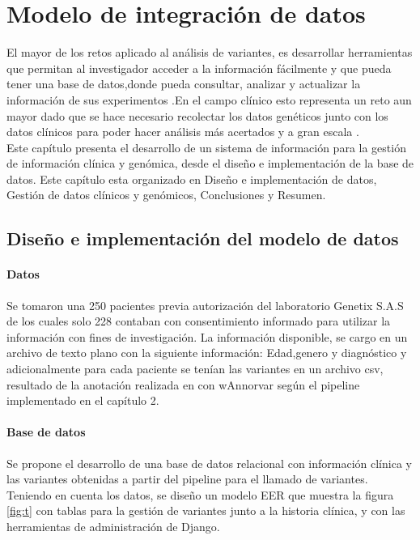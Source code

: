 \chapter{Modelo de integración de datos}

El mayor de los retos aplicado al análisis de variantes, es desarrollar herramientas que permitan al investigador acceder a la información fácilmente y que pueda tener una base de datos,donde pueda consultar, analizar y actualizar la información de sus experimentos \cite{Li2014}.En el campo clínico esto representa un reto aun mayor dado que se hace necesario recolectar los datos genéticos junto con los datos clínicos para poder hacer análisis más acertados y a gran escala \cite{Paila2013}.\\


Este capítulo presenta el desarrollo de un sistema de información para la gestión de información clínica y genómica, desde el diseño e implementación de la base de datos. Este capítulo esta  organizado en Diseño e implementación de datos, Gestión de datos clínicos y genómicos, Conclusiones y  Resumen.

\section{Diseño e implementación del modelo de datos}

\subsubsection{Datos}

Se tomaron una  250 pacientes previa autorización  del laboratorio Genetix S.A.S de los cuales solo 228 contaban con consentimiento informado para utilizar la información con fines de investigación.  La información disponible, se cargo en un archivo de texto plano con la siguiente información: Edad,genero y diagnóstico y adicionalmente para cada paciente se tenían las variantes en un archivo csv, resultado de la anotación realizada en con wAnnorvar según el pipeline implementado en el capítulo 2.\\

\subsubsection{Base de datos}

Se propone el desarrollo de una base de datos relacional con información clínica  y las variantes obtenidas a partir del pipeline para el llamado de variantes. Teniendo en cuenta los datos, se diseño un modelo EER que muestra la figura \ref{fig:t} con tablas para la gestión de variantes junto a la historia clínica, y con las herramientas de administración de Django.

